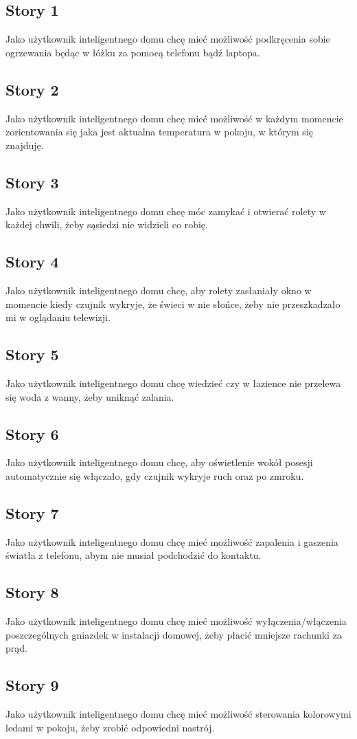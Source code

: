 	\subsection{Story 1}
	 Jako użytkownik inteligentnego domu chcę mieć możliwość podkręcenia sobie ogrzewania będąc w łóżku za pomocą telefonu bądź laptopa.
	
	\subsection{Story 2}
	Jako użytkownik inteligentnego domu chcę mieć możliwość w każdym momencie zorientowania się jaka jest aktualna temperatura w pokoju, w którym się znajduję.
	
	\subsection{Story 3}
	Jako użytkownik inteligentnego domu chcę móc zamykać i otwierać rolety w każdej chwili, żeby sąsiedzi nie widzieli co robię.
	
	\subsection{Story 4} 
	Jako użytkownik inteligentnego domu chcę, aby rolety zasłaniały okno w momencie kiedy czujnik wykryje, że świeci w nie słońce, żeby nie przeszkadzało mi w oglądaniu telewizji.
	
	\subsection{Story 5}
	Jako użytkownik inteligentnego domu chcę wiedzieć czy w łazience nie przelewa się woda z wanny, żeby uniknąć zalania. 
	
	\subsection{Story 6}
	Jako użytkownik inteligentnego domu chcę, aby oświetlenie wokół posesji automatycznie się włączało, gdy czujnik wykryje ruch oraz po zmroku.
	
	\subsection{Story 7}
	Jako użytkownik inteligentnego domu chcę mieć możliwość zapalenia i gaszenia światła z telefonu, abym nie musiał podchodzić do kontaktu.
	
	\subsection{Story 8}
	Jako użytkownik inteligentnego domu chcę mieć możliwość wyłączenia/włączenia poszczególnych gniazdek w instalacji domowej, żeby płacić mniejsze rachunki za prąd.
	
	\subsection{Story 9}
	Jako użytkownik inteligentnego domu chcę mieć możliwość sterowania kolorowymi ledami w pokoju, żeby zrobić odpowiedni nastrój.
	
	

